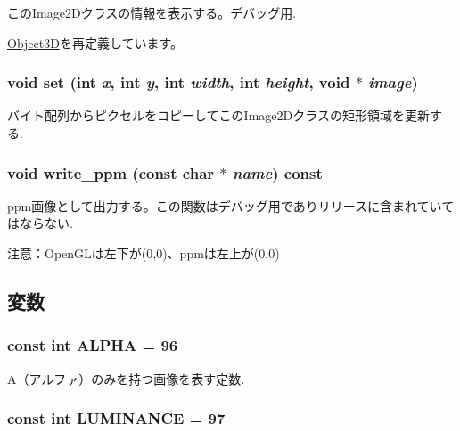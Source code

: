 このImage2Dクラスの情報を表示する。デバッグ用. 

\hyperlink{classm3g_1_1Object3D_6fea17fa1532df3794f8cb39cb4f911f}{Object3D}を再定義しています。\hypertarget{classm3g_1_1Image2D_fe9ef1abefb9e92b38687e27c9004bdc}{
\subsubsection[{set}]{\setlength{\rightskip}{0pt plus 5cm}void set (int {\em x}, \/  int {\em y}, \/  int {\em width}, \/  int {\em height}, \/  void $\ast$ {\em image})}}
\label{classm3g_1_1Image2D_fe9ef1abefb9e92b38687e27c9004bdc}


バイト配列からピクセルをコピーしてこのImage2Dクラスの矩形領域を更新する. \hypertarget{classm3g_1_1Image2D_6ec48e0681b8805c75ecadf4ba4a40cb}{
\subsubsection[{write\_\-ppm}]{\setlength{\rightskip}{0pt plus 5cm}void write\_\-ppm (const char $\ast$ {\em name}) const}}
\label{classm3g_1_1Image2D_6ec48e0681b8805c75ecadf4ba4a40cb}


ppm画像として出力する。この関数はデバッグ用でありリリースに含まれていてはならない.

注意：OpenGLは左下が(0,0)、ppmは左上が(0,0) 

\subsection{変数}
\hypertarget{classm3g_1_1Image2D_417581fcde4067111f47320edb2aa378}{
\subsubsection[{ALPHA}]{\setlength{\rightskip}{0pt plus 5cm}const int {\bf ALPHA} = 96}}
\label{classm3g_1_1Image2D_417581fcde4067111f47320edb2aa378}


A（アルファ）のみを持つ画像を表す定数. \hypertarget{classm3g_1_1Image2D_3cf02f5117269e8ff112cbf5ecb790cd}{
\subsubsection[{LUMINANCE}]{\setlength{\rightskip}{0pt plus 5cm}const int {\bf LUMINANCE} = 97}}
\label{classm3g_1_1Image2D_3cf02f5117269e8ff112cbf5ecb790cd}


